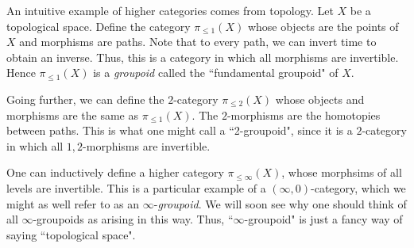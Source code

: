 \documentclass[11pt]{amsart}
\begin{document}
\begin{eg}
An intuitive example of higher categories comes from topology.
Let $X$ be a topological space.
Define the category $\pi_{\leq 1}(X)$ whose objects are the points of $X$ and morphisms are paths. 
Note that to every path, we can invert time to obtain an inverse. 
Thus, this is a category in which all morphisms are invertible. 
Hence $\pi_{\leq 1}(X)$ is a {\em groupoid} called the ``fundamental groupoid" of $X$. 

Going further, we can define the $2$-category $\pi_{\leq 2} (X)$ whose objects and morphisms are the same as $\pi_{\leq 1}(X)$. 
The $2$-morphisms are the homotopies between paths. 
This is what one might call a ``2-groupoid", since it is a $2$-category in which all $1,2$-morphisms are invertible. 

One can inductively define a higher category $\pi_{\leq \infty}(X)$, whose morphsims of all levels are invertible. 
This is a particular example of a $(\infty,0)$-category, which we might as well refer to as an $\infty$-{\em groupoid}. 
We will soon see why one should think of all $\infty$-groupoids as arising in this way. 
Thus, ``$\infty$-groupoid" is just a fancy way of saying ``topological space". 
\end{eg}
\end{document}
